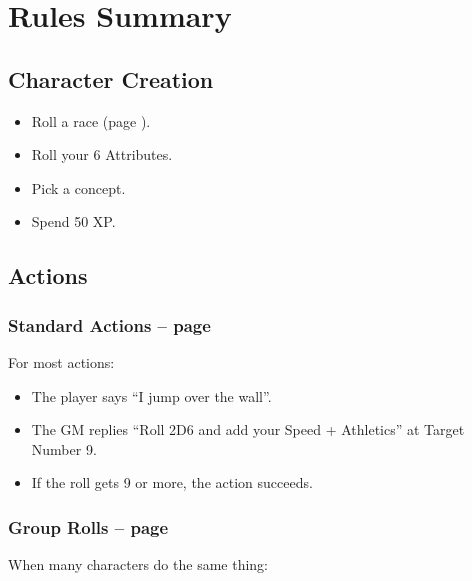 \section*{Rules Summary}

\begin{multicols}{2}

\subsection{Character Creation}

\begin{itemize}

  \item
  Roll a race (page \pageref{raceRoll}).
  \item
  Roll your 6 Attributes.
  \item
  Pick a concept.
  \item
  Spend 50 XP.

\end{itemize}

\subsection{Actions}

\subsubsection{Standard Actions -- page \pageref{basicaction}}

For most actions:

\begin{itemize}

  \item
  The player says ``I jump over the wall''.
  \item
  The GM replies ``Roll 2D6 and add your Speed + Athletics'' at Target Number 9.
  \item
  If the roll gets 9 or more, the action succeeds.

\end{itemize}

\subsubsection{Group Rolls -- page \pageref{grouproll}}

When many characters do the same thing:

\begin{itemize}


\end{itemize}
\end{multicols}
